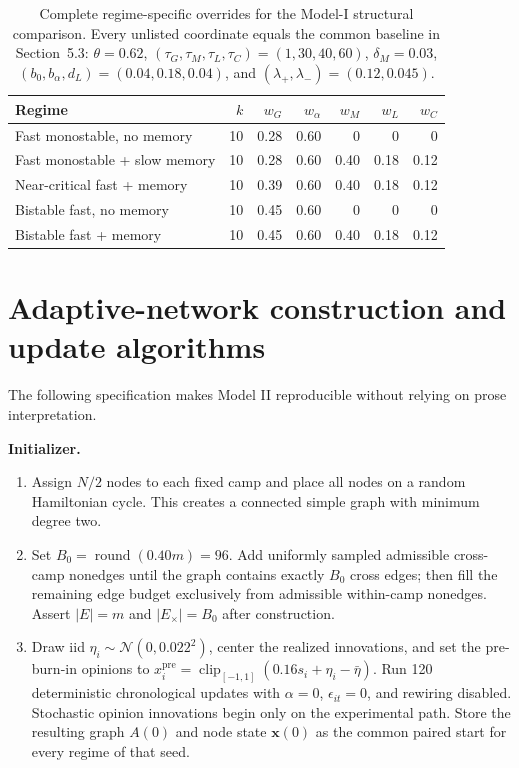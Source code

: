 \documentclass[pdflatex,sn-mathphys-num]{sn-jnl}
\newcommand{\inlinehead}[1]{\par\smallskip\noindent\textbf{#1}\ }
\begin{document}
\begin{appendices}
\begin{table}[!htbp]
\centering
\caption{Complete regime-specific overrides for the Model-I structural comparison. Every unlisted coordinate equals the common baseline in Section~5.3: $\theta=0.62$, $(\tau_G,\tau_M,\tau_L,\tau_C)=(1,30,40,60)$, $\delta_M=0.03$, $(b_0,b_\alpha,d_L)=(0.04,0.18,0.04)$, and $(\lambda_+,\lambda_-)=(0.12,0.045)$.}
\label{tab:model-i-regime-parameters}
\footnotesize
\setlength{\tabcolsep}{3pt}
\begin{tabular}{|p{4.0cm}|r|r|r|r|r|r|}
\hline
\textbf{Regime} & $k$ & $w_G$ & $w_\alpha$ & $w_M$ & $w_L$ & $w_C$\\
\hline
Fast monostable, no memory & 10 & 0.28 & 0.60 & 0 & 0 & 0\\
\hline
Fast monostable + slow memory & 10 & 0.28 & 0.60 & 0.40 & 0.18 & 0.12\\
\hline
Near-critical fast + memory & 10 & 0.39 & 0.60 & 0.40 & 0.18 & 0.12\\
\hline
Bistable fast, no memory & 10 & 0.45 & 0.60 & 0 & 0 & 0\\
\hline
Bistable fast + memory & 10 & 0.45 & 0.60 & 0.40 & 0.18 & 0.12\\
\hline
\end{tabular}
\end{table}

\section{Adaptive-network construction and update algorithms}

The following specification makes Model II reproducible without relying on prose interpretation.

\inlinehead{Initializer.}
\begin{enumerate}
  \item Assign $N/2$ nodes to each fixed camp and place all nodes on a random Hamiltonian cycle. This creates a connected simple graph with minimum degree two.
  \item Set $B_0=\operatorname{round}(0.40m)=96$. Add uniformly sampled admissible cross-camp nonedges until the graph contains exactly $B_0$ cross edges; then fill the remaining edge budget exclusively from admissible within-camp nonedges. Assert $|E|=m$ and $|E_\times|=B_0$ after construction.
  \item Draw iid $\eta_i\sim\mathcal N(0,0.022^2)$, center the realized innovations, and set the pre-burn-in opinions to $x_i^{\mathrm{pre}}=\operatorname{clip}_{[-1,1]}(0.16s_i+\eta_i-\bar\eta)$. Run 120 deterministic chronological updates with $\alpha=0$, $\epsilon_{it}=0$, and rewiring disabled. Stochastic opinion innovations begin only on the experimental path. Store the resulting graph $A(0)$ and node state $\bm x(0)$ as the common paired start for every regime of that seed.
\end{enumerate}


\end{appendices}
\end{document}

